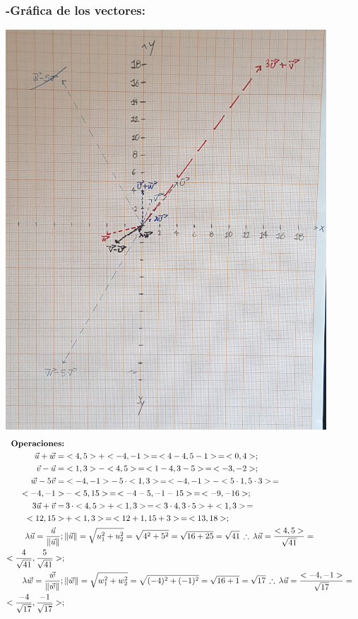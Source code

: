 \documentclass[letterpaper, 12pt]{article}
\begin{document}
\subsubsection*{-Gráfica de los vectores:}
\centering
\includegraphics[width=12cm,]{grafica.jpg}
\justify
\begin{align*}
\textbf{Operaciones:}\\ \text{\newline}
\vec{u}+\vec{w}=&<4,5>+<-4,-1>\,=\,<4-4,5-1>\,=\,<0,4>;\\
\vec{v}-\vec{u}=&<1,3>-<4,5>\,=\,<1-4,3-5>\,=\,<-3,-2>;\\
\vec{w}-5\vec{v}=&<-4,-1>-\,5\,\cdot<1,3>\,=\,<-4,-1>-<5\cdot 1,5\cdot 3>\,=
\\<-4,-1>&\,-<5,15>\,=\,<-4-5,-1-15>\,=\,<-9,-16>;\\
3\vec{u}+\vec{v}=&\,3\,\cdot<4,5>+<1,3>\,=\,<3\cdot 4,3\cdot 5>+<1,3>\,=
\\<12,15>&\,+<1,3>\,=\,<12+1,15+3>\,=\,<13,18>;\\
\lambda\vec{u}=\frac{\vec{u}}{\|\vec{u}\|};\,&\|\vec{u}\|=\sqrt{u_1^2+u_2^2}=\sqrt{4^2+5^2}=\sqrt{16+25}=\sqrt{41}\,\therefore\,\lambda\vec{u}=\frac{<4,5>}{\sqrt{41}}=\\
<\frac{4}{\sqrt{41}},\frac{5}{\sqrt{41}}>;\\
\lambda\vec{w}=\frac{\vec{w}}{\|\vec{w}\|};\,&\|\vec{w}\|=\sqrt{w_1^2+w_2^2}=\sqrt{(-4)^2+(-1)^2}=\sqrt{16+1}=\sqrt{17}\,\therefore\,\lambda\vec{u}=\frac{<-4,-1>}{\sqrt{17}}=\\
<\frac{-4}{\sqrt{17}},\frac{-1}{\sqrt{17}}>;\\
\end{align*}
\end{document}
